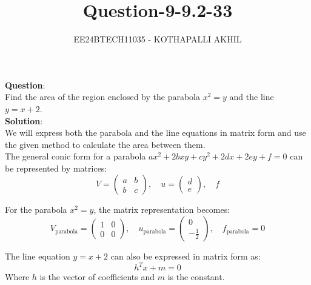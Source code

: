 \documentclass[journal]{IEEEtran}
\begin{document}

\title{Question-9-9.2-33}
\author{EE24BTECH11035 - KOTHAPALLI AKHIL}
{\let\newpage\relax\maketitle}
\vspace{-10mm}
\textbf{Question}:\\
Find the area of the region enclosed by the parabola $x
^2 = y$ and the line $y = x + 2$.\\
\textbf{Solution}:\\
We will express both the parabola and the line equations in matrix form and use the given method to calculate the area between them.\\

The general conic form for a parabola $ax^2 + 2bxy + cy^2 + 2dx + 2ey + f = 0$ can be represented by matrices:
\begin{equation}
V = \begin{pmatrix} a & b \\ b & c \end{pmatrix}, \quad u = \begin{pmatrix} d \\ e \end{pmatrix}, \quad f
\end{equation}

For the parabola $x^2 = y$, the matrix representation becomes:
\begin{equation}
V_{\text{parabola}} = \begin{pmatrix} 1 & 0 \\ 0 & 0 \end{pmatrix}, \quad u_{\text{parabola}} = \begin{pmatrix} 0 \\ -\frac{1}{2} \end{pmatrix}, \quad f_{\text{parabola}} = 0
\end{equation}



The line equation $y = x + 2$ can also be expressed in matrix form as:
\begin{equation}
h^T x + m = 0
\end{equation}
Where $h$ is the vector of coefficients and $m$ is the constant.
\end{document}
